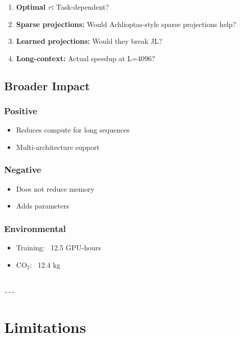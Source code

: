 \begin{enumerate}
\item \textbf{Optimal $r$:} Task-dependent?
\item \textbf{Sparse projections:} Would Achlioptas-style sparse projections help?
\item \textbf{Learned projections:} Would they break JL?
\item \textbf{Long-context:} Actual speedup at L=4096?

\end{enumerate}
\subsection{Broader Impact}

\subsubsection{Positive}
\begin{itemize}
\item Reduces compute for long sequences
\item Multi-architecture support

\end{itemize}
\subsubsection{Negative}
\begin{itemize}
\item Does not reduce memory
\item Adds parameters

\end{itemize}
\subsubsection{Environmental}
\begin{itemize}
\item Training: ~12.5 GPU-hours
\item CO$_2$: ~12.4 kg
\end{itemize}
\begin{lstlisting}

---
\end{lstlisting}


\section{Limitations}


